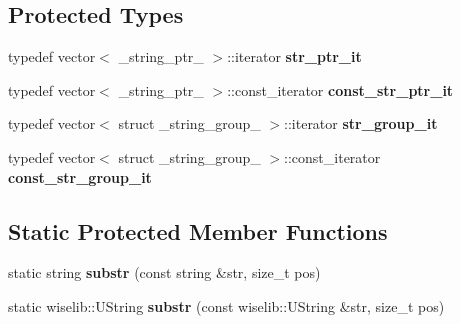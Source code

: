 \subsection*{Protected Types}
\begin{CompactItemize}
\item 
\hypertarget{classBucket_b4d836714b55abe0070d29c9bab6dd7e}{
typedef vector$<$ \_\-string\_\-ptr\_\- $>$::iterator \textbf{str\_\-ptr\_\-it}}
\label{classBucket_b4d836714b55abe0070d29c9bab6dd7e}

\item 
\hypertarget{classBucket_7731059df8745133309b5124d764a96a}{
typedef vector$<$ \_\-string\_\-ptr\_\- $>$::const\_\-iterator \textbf{const\_\-str\_\-ptr\_\-it}}
\label{classBucket_7731059df8745133309b5124d764a96a}

\item 
\hypertarget{classBucket_da98ccc671d48e2aa6fa1a93850c0cd8}{
typedef vector$<$ struct \_\-string\_\-group\_\- $>$::iterator \textbf{str\_\-group\_\-it}}
\label{classBucket_da98ccc671d48e2aa6fa1a93850c0cd8}

\item 
\hypertarget{classBucket_c5b21719f7710483bce0de44d4ad85d2}{
typedef vector$<$ struct \_\-string\_\-group\_\- $>$::const\_\-iterator \textbf{const\_\-str\_\-group\_\-it}}
\label{classBucket_c5b21719f7710483bce0de44d4ad85d2}

\end{CompactItemize}
\subsection*{Static Protected Member Functions}
\begin{CompactItemize}
\item 
\hypertarget{classBucket_7c0cb0d48d112a17e405d4e60fbc4f41}{
static string \textbf{substr} (const string \&str, size\_\-t pos)}
\label{classBucket_7c0cb0d48d112a17e405d4e60fbc4f41}

\item 
\hypertarget{classBucket_7125acd6c81aad5edb7bb432ea253fbb}{
static wiselib::UString \textbf{substr} (const wiselib::UString \&str, size\_\-t pos)}
\label{classBucket_7125acd6c81aad5edb7bb432ea253fbb}

\end{CompactItemize}
